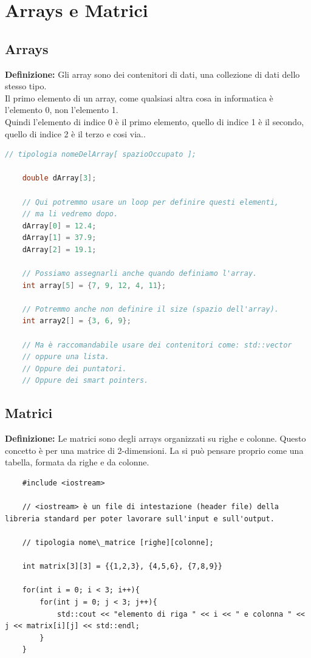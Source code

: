 \section{Arrays e Matrici}

\subsection{Arrays}

\textsf{\small \textbf{Definizione: } Gli array sono dei contenitori di dati, una collezione di dati dello stesso tipo.} \\

\textsf{\small Il primo elemento di un array, come qualsiasi altra cosa in informatica è l'elemento 0, non l'elemento 1.}\\

\textsf{\small Quindi l'elemento di indice 0 è il primo elemento, quello di indice 1 è il secondo, quello di indice 2 è il terzo e cosi via..} \\

\begin{lstlisting}[language=C++]
	// tipologia nomeDelArray[ spazioOccupato ];
	
	double dArray[3];
	
	// Qui potremmo usare un loop per definire questi elementi, 
	// ma li vedremo dopo.
	dArray[0] = 12.4;
	dArray[1] = 37.9;
	dArray[2] = 19.1;
	
	// Possiamo assegnarli anche quando definiamo l'array.
	int array[5] = {7, 9, 12, 4, 11};
	
	// Potremmo anche non definire il size (spazio dell'array).
	int array2[] = {3, 6, 9};
	
	// Ma è raccomandabile usare dei contenitori come: std::vector 
	// oppure una lista.
	// Oppure dei puntatori.
	// Oppure dei smart pointers.
\end{lstlisting}

\subsection{Matrici}

\textsf{\small \textbf{Definizione: } Le matrici sono degli arrays organizzati su righe e colonne. Questo concetto è per una matrice di 2-dimensioni. La si può pensare proprio come una tabella, formata da righe e da colonne.} \\

\begin{lstlisting}
	#include <iostream> 
	
	// <iostream> è un file di intestazione (header file) della libreria standard per poter lavorare sull'input e sull'output.
	
	// tipologia nome\_matrice [righe][colonne];
	
	int matrix[3][3] = {{1,2,3}, {4,5,6}, {7,8,9}}
	
	for(int i = 0; i < 3; i++){
		for(int j = 0; j < 3; j++){
			std::cout << "elemento di riga " << i << " e colonna " << j << matrix[i][j] << std::endl;
		}
	}
\end{lstlisting}

